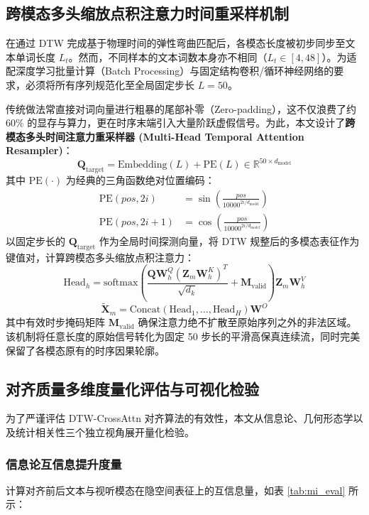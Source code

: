 \subsection{跨模态多头缩放点积注意力时间重采样机制}
在通过 DTW 完成基于物理时间的弹性弯曲匹配后，各模态长度被初步同步至文本单词长度 $L_t$。然而，不同样本的文本词数本身亦不相同（$L_t \in [4, 48]$）。为适配深度学习批量计算（Batch Processing）与固定结构卷积/循环神经网络的要求，必须将所有序列规范化至全局固定步长 $L=50$。

传统做法常直接对词向量进行粗暴的尾部补零（Zero-padding），这不仅浪费了约 $60\%$ 的显存与算力，更在时序末端引入大量阶跃虚假信号。为此，本文设计了\textbf{跨模态多头时间注意力重采样器 (Multi-Head Temporal Attention Resampler)}：
\begin{equation}
\mathbf{Q}_{\text{target}} = \text{Embedding}(L) + \text{PE}(L) \in \mathbb{R}^{50 \times d_{\text{model}}}
\end{equation}
其中 $\text{PE}(\cdot)$ 为经典的三角函数绝对位置编码：
\begin{align}
\text{PE}(pos, 2i) &= \sin\left(\frac{pos}{10000^{2i/d_{\text{model}}}}\right) \\
\text{PE}(pos, 2i+1) &= \cos\left(\frac{pos}{10000^{2i/d_{\text{model}}}}\right)
\end{align}
以固定步长的 $\mathbf{Q}_{\text{target}}$ 作为全局时间探测向量，将 DTW 规整后的多模态表征作为键值对，计算跨模态多头缩放点积注意力：
\begin{equation}
\text{Head}_h = \text{softmax}\left(\frac{\mathbf{Q} \mathbf{W}_h^Q (\mathbf{Z}_m \mathbf{W}_h^K)^T}{\sqrt{d_k}} + \mathbf{M}_{\text{valid}}\right) \mathbf{Z}_m \mathbf{W}_h^V
\end{equation}
\begin{equation}
\tilde{\mathbf{X}}_m = \text{Concat}(\text{Head}_1, \dots, \text{Head}_H) \mathbf{W}^O
\end{equation}
其中有效时步掩码矩阵 $\mathbf{M}_{\text{valid}}$ 确保注意力绝不扩散至原始序列之外的非法区域。该机制将任意长度的原始信号转化为固定 50 步长的平滑高保真连续流，同时完美保留了各模态原有的时序因果轮廓。

\subsection{对齐质量多维度量化评估与可视化检验}
为了严谨评估 DTW-CrossAttn 对齐算法的有效性，本文从信息论、几何形态学以及统计相关性三个独立视角展开量化检验。

\subsubsection{信息论互信息提升度量}
计算对齐前后文本与视听模态在隐空间表征上的互信息量，如表 \ref{tab:mi_eval} 所示：

